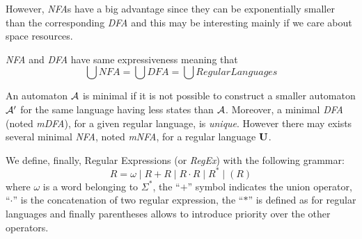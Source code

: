 However, \textit{NFA}s have a big advantage since they can be exponentially smaller than the corresponding \textit{DFA} and this may be interesting mainly if we care about space resources.

\begin{remark}
  \textit{NFA} and \textit{DFA} have same expressiveness meaning that \[\bigcup NFA = \bigcup DFA = \bigcup RegularLanguages\]
\end{remark}

\begin{definition}
  \label{lemma:minimalAut}
  An automaton $\mathcal{A}$ is minimal if it is not possible to construct a smaller automaton $\mathcal{A}'$ for the same language having less states than $\mathcal{A}$. Moreover, a minimal \textit{DFA} (noted \textit{mDFA}), for a given regular language, is \textit{unique}. However there may exists several minimal \textit{NFA}, noted \textit{mNFA}, for a regular language $\mathbf{U}$.
\end{definition}

We define, finally, Regular Expressions (or \textit{RegEx}) with the following grammar:
\[R = \omega \mid R + R \mid R \cdot R \mid R^* \mid (R)\]
where $\omega$ is a word belonging to $\Sigma^*$, the ``$+$'' symbol indicates the union operator, ``$\cdot$'' is the concatenation of two regular expression, the ``$*$'' is defined as for regular languages and finally parentheses allows to introduce priority over the other operators.

